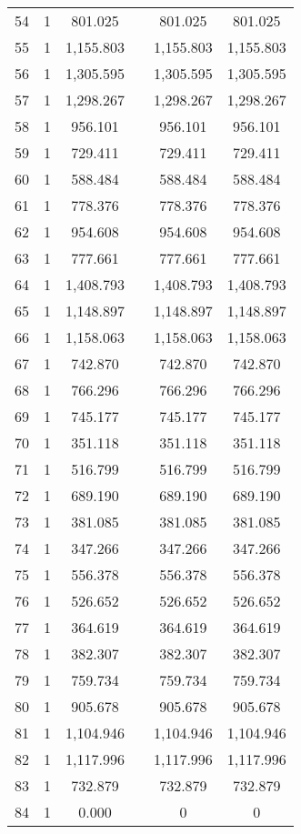 \begin{table}[!htbp]
\begin{tabular}{@{\extracolsep{5pt}}lccccc}
54 & 1 & 801.025 &  & 801.025 & 801.025 \\ 
55 & 1 & 1,155.803 &  & 1,155.803 & 1,155.803 \\ 
56 & 1 & 1,305.595 &  & 1,305.595 & 1,305.595 \\ 
57 & 1 & 1,298.267 &  & 1,298.267 & 1,298.267 \\ 
58 & 1 & 956.101 &  & 956.101 & 956.101 \\ 
59 & 1 & 729.411 &  & 729.411 & 729.411 \\ 
60 & 1 & 588.484 &  & 588.484 & 588.484 \\ 
61 & 1 & 778.376 &  & 778.376 & 778.376 \\ 
62 & 1 & 954.608 &  & 954.608 & 954.608 \\ 
63 & 1 & 777.661 &  & 777.661 & 777.661 \\ 
64 & 1 & 1,408.793 &  & 1,408.793 & 1,408.793 \\ 
65 & 1 & 1,148.897 &  & 1,148.897 & 1,148.897 \\ 
66 & 1 & 1,158.063 &  & 1,158.063 & 1,158.063 \\ 
67 & 1 & 742.870 &  & 742.870 & 742.870 \\ 
68 & 1 & 766.296 &  & 766.296 & 766.296 \\ 
69 & 1 & 745.177 &  & 745.177 & 745.177 \\ 
70 & 1 & 351.118 &  & 351.118 & 351.118 \\ 
71 & 1 & 516.799 &  & 516.799 & 516.799 \\ 
72 & 1 & 689.190 &  & 689.190 & 689.190 \\ 
73 & 1 & 381.085 &  & 381.085 & 381.085 \\ 
74 & 1 & 347.266 &  & 347.266 & 347.266 \\ 
75 & 1 & 556.378 &  & 556.378 & 556.378 \\ 
76 & 1 & 526.652 &  & 526.652 & 526.652 \\ 
77 & 1 & 364.619 &  & 364.619 & 364.619 \\ 
78 & 1 & 382.307 &  & 382.307 & 382.307 \\ 
79 & 1 & 759.734 &  & 759.734 & 759.734 \\ 
80 & 1 & 905.678 &  & 905.678 & 905.678 \\ 
81 & 1 & 1,104.946 &  & 1,104.946 & 1,104.946 \\ 
82 & 1 & 1,117.996 &  & 1,117.996 & 1,117.996 \\ 
83 & 1 & 732.879 &  & 732.879 & 732.879 \\ 
84 & 1 & 0.000 &  & 0 & 0 \\ 

\end{tabular}
\end{table}
